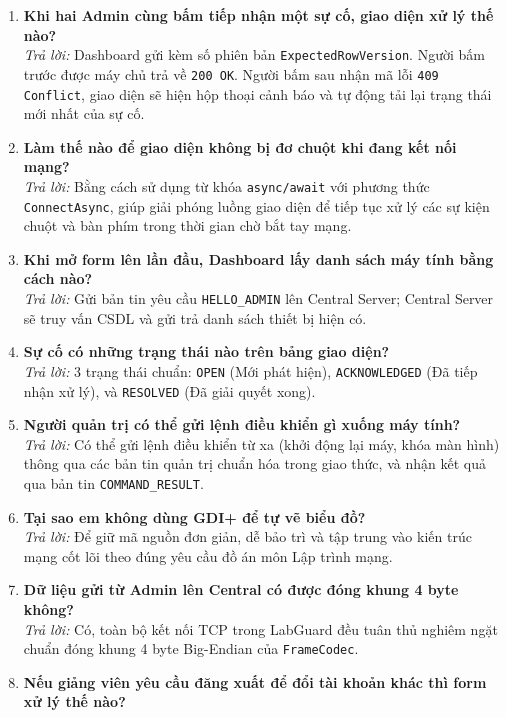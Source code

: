 \documentclass[12pt,a4paper]{article}
\begin{document}
\begin{enumerate}[leftmargin=*, label=\textbf{Câu \arabic*:}]
  \item \textbf{Khi hai Admin cùng bấm tiếp nhận một sự cố, giao diện xử lý thế nào?} \\
    \textit{Trả lời:} Dashboard gửi kèm số phiên bản \texttt{ExpectedRowVersion}. Người bấm trước được máy chủ trả về \texttt{200 OK}. Người bấm sau nhận mã lỗi \texttt{409 Conflict}, giao diện sẽ hiện hộp thoại cảnh báo và tự động tải lại trạng thái mới nhất của sự cố.
  \item \textbf{Làm thế nào để giao diện không bị đơ chuột khi đang kết nối mạng?} \\
    \textit{Trả lời:} Bằng cách sử dụng từ khóa \texttt{async/await} với phương thức \texttt{ConnectAsync}, giúp giải phóng luồng giao diện để tiếp tục xử lý các sự kiện chuột và bàn phím trong thời gian chờ bắt tay mạng.
  \item \textbf{Khi mở form lên lần đầu, Dashboard lấy danh sách máy tính bằng cách nào?} \\
    \textit{Trả lời:} Gửi bản tin yêu cầu \texttt{HELLO\_ADMIN} lên Central Server; Central Server sẽ truy vấn CSDL và gửi trả danh sách thiết bị hiện có.
  \item \textbf{Sự cố có những trạng thái nào trên bảng giao diện?} \\
    \textit{Trả lời:} 3 trạng thái chuẩn: \texttt{OPEN} (Mới phát hiện), \texttt{ACKNOWLEDGED} (Đã tiếp nhận xử lý), và \texttt{RESOLVED} (Đã giải quyết xong).
  \item \textbf{Người quản trị có thể gửi lệnh điều khiển gì xuống máy tính?} \\
    \textit{Trả lời:} Có thể gửi lệnh điều khiển từ xa (khởi động lại máy, khóa màn hình) thông qua các bản tin quản trị chuẩn hóa trong giao thức, và nhận kết quả qua bản tin \texttt{COMMAND\_RESULT}.
  \item \textbf{Tại sao em không dùng GDI+ để tự vẽ biểu đồ?} \\
    \textit{Trả lời:} Để giữ mã nguồn đơn giản, dễ bảo trì và tập trung vào kiến trúc mạng cốt lõi theo đúng yêu cầu đồ án môn Lập trình mạng.
  \item \textbf{Dữ liệu gửi từ Admin lên Central có được đóng khung 4 byte không?} \\
    \textit{Trả lời:} Có, toàn bộ kết nối TCP trong LabGuard đều tuân thủ nghiêm ngặt chuẩn đóng khung 4 byte Big-Endian của \texttt{FrameCodec}.
  \item \textbf{Nếu giảng viên yêu cầu đăng xuất để đổi tài khoản khác thì form xử lý thế nào?} \\

\end{enumerate}
\end{document}
